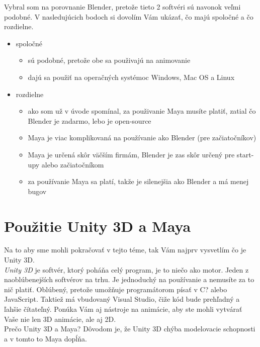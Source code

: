 \documentclass[10pt,oneside,slovak,a4paper]{article}
\begin{document}
Vybral som na porovnanie Blender, pretože tieto 2 softvéri sú navonok veľmi podobné. V nasledujúcich bodoch si dovolím Vám ukázať, čo majú spoločné a čo rozdielne.

\begin{itemize}
\item spoločné
	\begin{itemize}
	\item sú podobné, pretože obe sa použivajú na animovanie
	\item dajú sa použiť na operačných systémoc Windows, Mac OS a Linux
	\end{itemize}

\item rozdielne
	\begin{itemize}
	\item ako som už v úvode spomínal, za použivanie Maya musíte platiť, zatial čo Blender je zadarmo, lebo je open-source
	\item Maya je viac komplikovaná na používanie ako Blender (pre začiatočníkov)
	\item Maya je určená skôr väčším firmám, Blender je zas skôr určený pre start-upy alebo začiatočníkom
	\item za používanie Maya sa platí, takže je silenejšia ako Blender a má menej bugov\cite{educba2021}
	\end{itemize}
\end{itemize}



\section{Použitie Unity 3D a Maya} \label{3d}

Na to aby sme mohli pokračovať v tejto téme, tak Vám najprv vysvetlím čo je Unity 3D.\\

\emph{Unity 3D} je softvér, ktorý poháňa celý program, je to niečo ako motor. Jeden z naoblúbenejších softvérov na trhu. Je jednoduchý na používanie a nemusíte za to nič platiť. Oblúbený, pretože umožňuje programátorom písať v C? alebo JavaScript. Taktiež má vbudovaný Visual Studio, čiže kód bude prehľadný a ľahšie čítateľný. Ponúka Vám aj nástroje na animácie, aby ste mohli vytvárať Vaše nie len 3D animácie, ale aj 2D.\\

Prečo Unity 3D a Maya? Dôvodom je, že Unity 3D chýba modelovacie schopnosti a v tomto to Maya dopĺňa.\cite{labschutz2011content}\\
\end{document}
